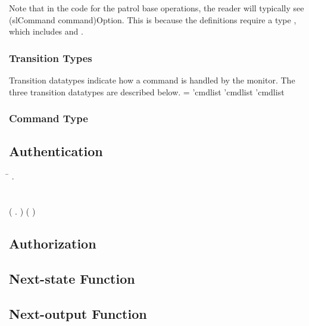\documentclass[../../main/main.tex]{subfiles}
\begin{document}
Note that in the  code for the patrol base operations, the reader will typically see (slCommand command)Option.  This is because the definitions require a type , which includes   and .




\subsubsection{Transition Types}
Transition datatypes indicate how a command is handled by the monitor.  The three transition datatypes are described below. 
 =  'cmdlist \HOLTokenBar{}  'cmdlist \HOLTokenBar{}  'cmdlist




\subsubsection{Command Type}
\subsection{Authentication}

\begin{tabbing}
\parskip=8pt

\HOLTokenTurnstile{} \=\HOLSymConst{\HOLTokenForall{}} . \\
    \>    \\
    \> \HOLSymConst{\HOLTokenEquiv{}} \\
    \>  (\HOLTokenLambda{} .  \HOLSymConst{\HOLTokenConj{}} )  (  )
\parskip=18pt
\end{tabbing}
     
\subsection{Authorization}
\subsection{Next-state Function}
\subsection{Next-output Function}
\end{document}
